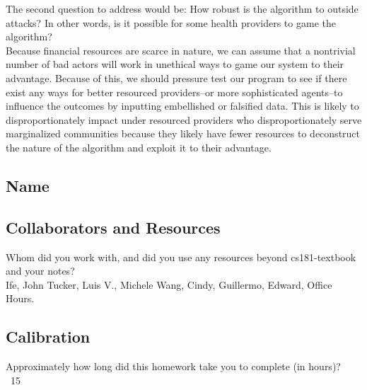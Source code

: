\documentclass[submit]{harvardml}
\begin{document}
The second question to address would be: How robust is the algorithm to outside attacks? In other words, is it possible for some health providers to game the algorithm? \\

Because financial resources are scarce in nature, we can assume that a nontrivial number of bad actors will work in unethical ways to game our system to their advantage. Because of this, we should pressure test our program to see if there exist any ways for better resourced providers–or more sophisticated agents–to influence the outcomes by inputting embellished or falsified data. This is likely to disproportionately impact under resourced providers who disproportionately serve marginalized communities because they likely have fewer resources to deconstruct the nature of the algorithm and exploit it to their advantage. 

\newpage
\subsection*{Name}

\subsection*{Collaborators and Resources}
Whom did you work with, and did you use any resources beyond cs181-textbook and your notes?\\

Ife, John Tucker, Luis V., Michele Wang, Cindy, 
Guillermo, Edward, Office Hours.

\subsection*{Calibration}
Approximately how long did this homework take you to complete (in hours)? \\

~15
\end{document}
